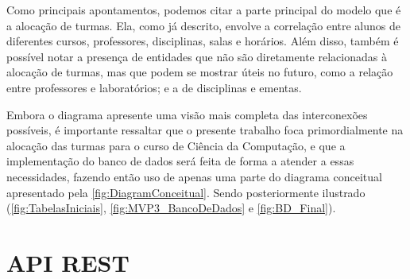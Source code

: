 Como principais apontamentos, podemos citar a parte principal do modelo que é a alocação de turmas. Ela, como já descrito, envolve a correlação entre alunos de diferentes cursos, professores, disciplinas, salas e horários. Além disso, também é possível notar a presença de entidades que não são diretamente relacionadas à alocação de turmas, mas que podem se mostrar úteis no futuro, como a relação entre professores e laboratórios; e a de disciplinas e ementas.

Embora o diagrama apresente uma visão mais completa das interconexões possíveis, é importante ressaltar que o presente trabalho foca primordialmente na alocação das turmas para o curso de Ciência da Computação, e que a implementação do banco de dados será feita de forma a atender a essas necessidades, fazendo então uso de apenas uma parte do diagrama conceitual apresentado pela \autoref{fig:DiagramConceitual}. Sendo posteriormente ilustrado (\autoref{fig:TabelasIniciais}, \autoref{fig:MVP3_BancoDeDados} e \autoref{fig:BD_Final}).





\section{API REST} \label{sec:Funcionamento Geral} %

